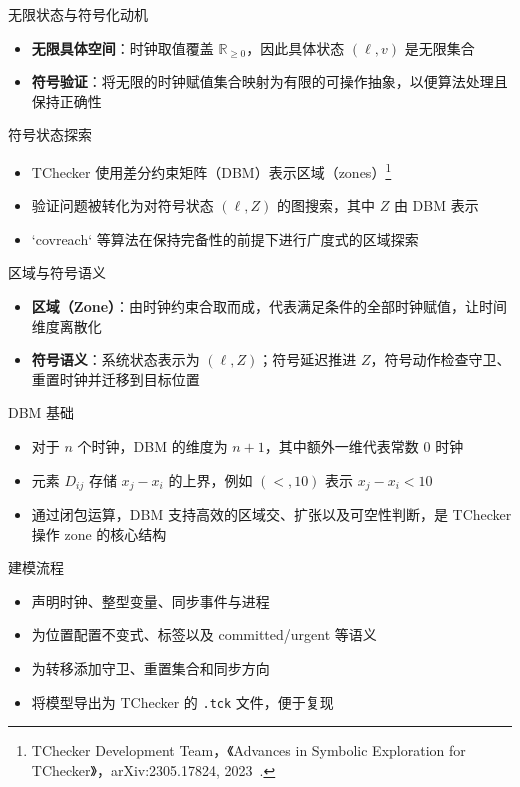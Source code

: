 \documentclass{beamer}
\begin{document}
\begin{frame}{无限状态与符号化动机}
  \begin{itemize}
    \item \textbf{无限具体空间}：时钟取值覆盖 \(\mathbb{R}_{\ge 0}\)，因此具体状态 \((\ell, v)\) 是无限集合
    \item \textbf{符号验证}：将无限的时钟赋值集合映射为有限的可操作抽象，以便算法处理且保持正确性
  \end{itemize}
\end{frame}

\begin{frame}{符号状态探索}
  \begin{itemize}
    \item TChecker 使用差分约束矩阵（DBM）表示区域（zones）\footnote{\tiny TChecker Development Team，《Advances in Symbolic Exploration for TChecker》，arXiv:2305.17824, 2023~\cite{herbreteau2023tchecker-cn}.}
    \item 验证问题被转化为对符号状态 \((\ell, Z)\) 的图搜索，其中 \(Z\) 由 DBM 表示
    \item `covreach` 等算法在保持完备性的前提下进行广度式的区域探索
  \end{itemize}
\end{frame}

\begin{frame}{区域与符号语义}
  \begin{itemize}
    \item \textbf{区域（Zone）}：由时钟约束合取而成，代表满足条件的全部时钟赋值，让时间维度离散化
    \item \textbf{符号语义}：系统状态表示为 \((\ell, Z)\)；符号延迟推进 \(Z\)，符号动作检查守卫、重置时钟并迁移到目标位置
  \end{itemize}
\end{frame}

\begin{frame}{DBM 基础}
  \begin{itemize}
    \item 对于 \(n\) 个时钟，DBM 的维度为 \(n{+}1\)，其中额外一维代表常数 0 时钟
    \item 元素 \(D_{ij}\) 存储 \(x_j - x_i\) 的上界，例如 \((<,10)\) 表示 \(x_j - x_i < 10\)
    \item 通过闭包运算，DBM 支持高效的区域交、扩张以及可空性判断，是 TChecker 操作 zone 的核心结构
  \end{itemize}
\end{frame}

\begin{frame}{建模流程}
  \begin{itemize}
    \item 声明时钟、整型变量、同步事件与进程
    \item 为位置配置不变式、标签以及 committed/urgent 等语义
    \item 为转移添加守卫、重置集合和同步方向
    \item 将模型导出为 TChecker 的 \texttt{.tck} 文件，便于复现
  \end{itemize}
\end{frame}
\end{document}
